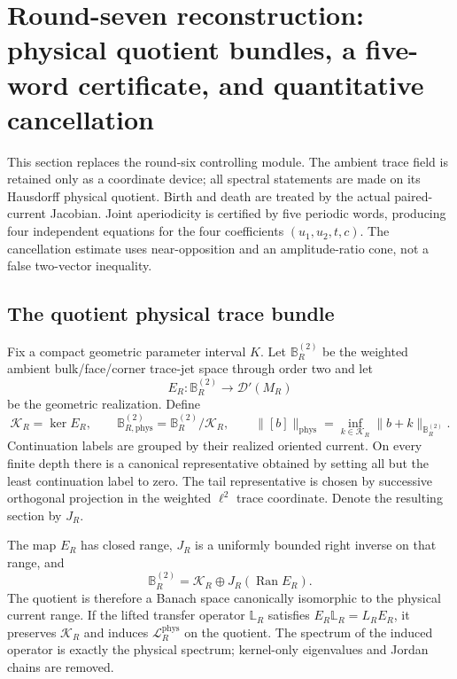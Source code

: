 \section{Round-seven reconstruction: physical quotient bundles, a five-word certificate, and quantitative cancellation}
\label{sec:r7-a2}

This section replaces the round-six controlling module.  The ambient trace
field is retained only as a coordinate device; all spectral statements are
made on its Hausdorff physical quotient.  Birth and death are treated by the
actual paired-current Jacobian.  Joint aperiodicity is certified by five
periodic words, producing four independent equations for the four coefficients
$(u_1,u_2,t,c)$.  The cancellation estimate uses near-opposition and an
amplitude-ratio cone, not a false two-vector inequality.

\subsection{The quotient physical trace bundle}

Fix a compact geometric parameter interval $K$.  Let $\mathbb B_R^{(2)}$ be
the weighted ambient bulk/face/corner trace-jet space through order two and let
\[
 E_R:\mathbb B_R^{(2)}\longrightarrow\mathscr D'(M_R)
\]
be the geometric realization.  Define
\[
 \mathscr K_R=\ker E_R,
 \qquad
 \mathbb B_{R,\mathrm{phys}}^{(2)}
 =\mathbb B_R^{(2)}/\mathscr K_R,
 \qquad
 \|[b]\|_{\mathrm{phys}}
 =\inf_{k\in\mathscr K_R}\|b+k\|_{\mathbb B_R^{(2)}}.
\]
Continuation labels are grouped by their realized oriented current.  On every
finite depth there is a canonical representative obtained by setting all but
the least continuation label to zero.  The tail representative is chosen by
successive orthogonal projection in the weighted $\ell^2$ trace coordinate.
Denote the resulting section by $J_R$.

\begin{lemma}
\label{lem:r7-a2-quotient}
The map $E_R$ has closed range, $J_R$ is a uniformly bounded right inverse on
that range, and
\[
 \mathbb B_R^{(2)}=\mathscr K_R\oplus J_R(\operatorname{Ran}E_R).
\]
The quotient is therefore a Banach space canonically isomorphic to the physical
current range.  If the lifted transfer operator $\mathbb L_R$ satisfies
$E_R\mathbb L_R=L_RE_R$, it preserves $\mathscr K_R$ and induces
$\mathcal L_R^{\mathrm{phys}}$ on the quotient.  The spectrum of the induced
operator is exactly the physical spectrum; kernel-only eigenvalues and Jordan
chains are removed.
\end{lemma}

